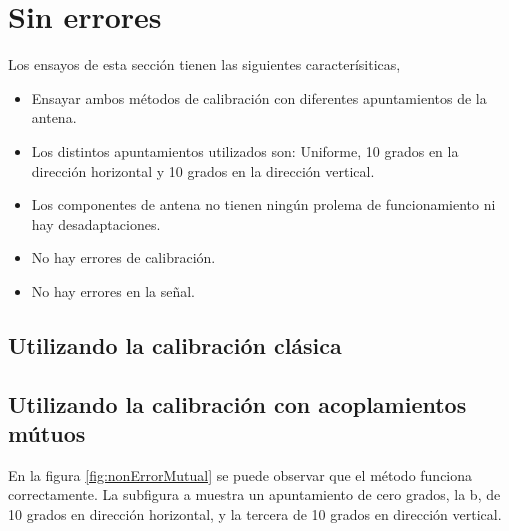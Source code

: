 \section{Sin errores}

Los ensayos de esta sección tienen las siguientes caracterísiticas,
\begin{itemize}
	\item Ensayar ambos métodos de calibración con diferentes apuntamientos de la antena.
	\item Los distintos apuntamientos utilizados son: Uniforme, 10 grados en la dirección horizontal y 10 grados en la dirección 
		vertical.
	\item Los componentes de antena no tienen ningún prolema de funcionamiento ni hay desadaptaciones.
	\item No hay errores de calibración.
	\item No hay errores en la señal.
\end{itemize}

\subsection{Utilizando la calibración clásica}
\subsection{Utilizando la calibración con acoplamientos mútuos}

En la figura \ref{fig:nonErrorMutual} se puede observar que el método funciona correctamente. La subfigura a muestra un 
apuntamiento de cero grados, la b, de 10 grados en dirección horizontal, y la tercera de 10 grados en dirección vertical.

